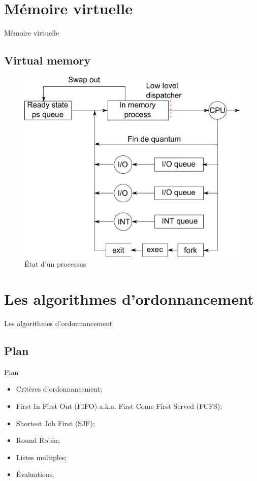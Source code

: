 \def\sectitle{Mémoire virtuelle}
\section{\sectitle}
\begin{frame}{\sectitle}
\def\subsectitle{Virtual memory}
\subsection{\subsectitle}

\begin{figure}
\includegraphics[width=.7\textwidth]{images/virtualmemoryDispatching.pdf}
\caption{État d'un processus}
\end{figure}

\end{frame}





\def\sectitle{Les algorithmes d'ordonnancement}
\section{\sectitle}

\begin{frame}{\sectitle}
\def\subsectitle{Plan}
\subsection{\subsectitle}

\begin{block}{\subsectitle}
\begin{itemize}
    \item Critères d'ordonnancement;
    \item First In First Out (FIFO) a.k.a. First Come First Served (FCFS);
    \item Shortest Job First (SJF);
    \item Round Robin;
    \item Listes multiples;
    \item Évaluations.
\end{itemize}
\end{block}

\end{frame}


